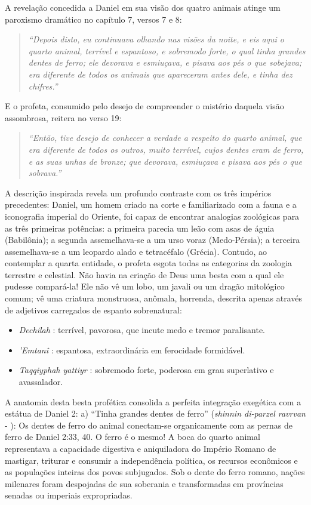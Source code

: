 \documentclass[11pt,a4paper,openany]{book}
\begin{document}
A revelação concedida a Daniel em sua visão dos quatro animais atinge um paroxismo dramático no capítulo 7, versos 7 e 8:

\begin{quote}
\itshape ``Depois disto, eu continuava olhando nas visões da noite, e eis aqui o quarto animal, terrível e espantoso, e sobremodo forte, o qual tinha grandes dentes de ferro; ele devorava e esmiuçava, e pisava aos pés o que sobejava; era diferente de todos os animais que apareceram antes dele, e tinha dez chifres.''
\end{quote}

E o profeta, consumido pelo desejo de compreender o mistério daquela visão assombrosa, reitera no verso 19:

\begin{quote}
\itshape ``Então, tive desejo de conhecer a verdade a respeito do quarto animal, que era diferente de todos os outros, muito terrível, cujos dentes eram de ferro, e as suas unhas de bronze; que devorava, esmiuçava e pisava aos pés o que sobrava.''
\end{quote}


A descrição inspirada revela um profundo contraste com os três impérios precedentes:
Daniel, um homem criado na corte e familiarizado com a fauna e a iconografia imperial do Oriente, foi capaz de encontrar analogias zoológicas para as três primeiras potências: a primeira parecia um leão com asas de águia (Babilônia); a segunda assemelhava-se a um urso voraz (Medo-Pérsia); a terceira assemelhava-se a um leopardo alado e tetracéfalo (Grécia). Contudo, ao contemplar a quarta entidade, o profeta esgota todas as categorias da zoologia terrestre e celestial. Não havia na criação de Deus uma besta com a qual ele pudesse compará-la! Ele não vê um lobo, um javali ou um dragão mitológico comum; vê uma criatura monstruosa, anômala, horrenda, descrita apenas através de adjetivos carregados de espanto sobrenatural:
\begin{itemize}
  \item \textit{Dechilah} : terrível, pavorosa, que incute medo e tremor paralisante.
  \item \textit{'Emtanî} : espantosa, extraordinária em ferocidade formidável.
  \item \textit{Taqqiyphah yattiyr} : sobremodo forte, poderosa em grau superlativo e avassalador.
\end{itemize}


A anatomia desta besta profética consolida a perfeita integração exegética com a estátua de Daniel 2:
a) ``Tinha grandes dentes de ferro'' (\textit{shinnin di-parzel ravrvan} - ): Os dentes de ferro do animal conectam-se organicamente com as pernas de ferro de Daniel 2:33, 40. O ferro é o mesmo! A boca do quarto animal representava a capacidade digestiva e aniquiladora do Império Romano de mastigar, triturar e consumir a independência política, os recursos econômicos e as populações inteiras dos povos subjugados. Sob o dente do ferro romano, nações milenares foram despojadas de sua soberania e transformadas em províncias senadas ou imperiais expropriadas.
\end{document}
